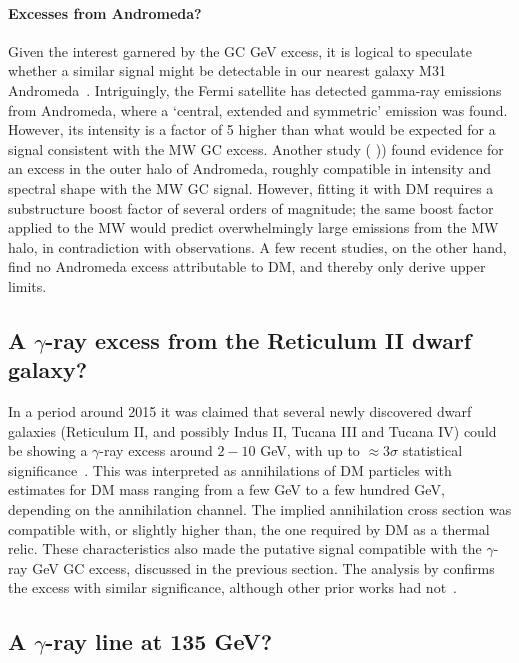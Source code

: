 \paragraph{Excesses from Andromeda?}
Given the interest garnered by the GC GeV excess, it is logical to speculate whether a similar signal might be detectable in our nearest galaxy M31 Andromeda~\cite{excessesM31}.
Intriguingly, the {\sc Fermi} satellite has detected gamma-ray emissions from Andromeda, where a `central, extended and symmetric' emission was found. However, its intensity is a factor of 5 higher than what would be expected for a signal consistent with the MW GC excess. Another study ( )) found evidence for an excess in the outer halo of Andromeda, roughly compatible in intensity and spectral shape with the MW GC signal. However, fitting it with DM requires a substructure boost factor of several orders of magnitude;  the same boost factor applied to the MW would predict overwhelmingly large emissions from the MW halo, in contradiction with observations.
 A few recent studies, on the other hand, find no Andromeda excess attributable to DM, and thereby only derive upper limits.



\subsection{A $\gamma$-ray excess from the Reticulum II dwarf galaxy?}\label{sec:Reticulumexcess}
In a period around 2015 it was claimed that several newly discovered dwarf galaxies (Reticulum II, and possibly Indus II, Tucana III and Tucana IV) could be showing a $\gamma$-ray excess around $2-10$ GeV, with up to $\approx3\sigma$ statistical significance~\cite{Reticulumexcess}. 
This was interpreted as annihilations of DM particles with estimates for DM mass ranging from a few GeV to a few hundred GeV, depending on the annihilation channel. The implied annihilation cross section was compatible with, or slightly higher than, the one required by DM as a thermal relic.
These characteristics also made the putative signal compatible with the $\gamma$-ray GeV GC excess, discussed in the previous section. 
The analysis by  confirms the excess with similar significance, although other prior works had not~\cite{Reticulumexcess}.


\subsection{A $\gamma$-ray line at  135 GeV?}\label{sec:135GeVline}

